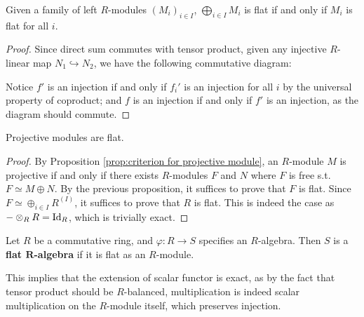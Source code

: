 \begin{proposition}
    Given a family of left $R$-modules $(M_i)_{i \in I}$, $\bigoplus_{i\in I} M_i$ is flat if and only if $M_i$ is flat for all $i$.
\end{proposition}

\begin{proof}
    Since direct sum commutes with tensor product, given any injective $R$-linear map $N_1 \hookrightarrow N_2$, we have the following commutative diagram:
    \begin{figure}[htbp]
        \centering
    \end{figure}
    Notice $f'$ is an injection if and only if $f_i'$ is an injection for all $i$ by the universal property of coproduct; and $f$ is an injection if and only if $f'$ is an injection, as the diagram should commute.
\end{proof}

\begin{corollary}
    Projective modules are flat.
\end{corollary}

\begin{proof}
    By Proposition \ref{prop:criterion for projective module}, an $R$-module $M$ is projective if and only if there exists $R$-modules $F$ and $N$ where $F$ is free s.t. $F \simeq M \oplus N$. By the previous proposition, it suffices to prove that $F$ is flat. Since $F \simeq \oplus_{i \in I} R^{(I)}$, it suffices to prove that $R$ is flat. This is indeed the case as $- \otimes_R R = \mathrm{Id}_R$, which is trivially exact.
\end{proof}

\begin{definition}
    Let $R$ be a commutative ring, and $\varphi: R \to S$ specifies an $R$-algebra. Then $S$ is a \textbf{flat $\mathbf{R}$-algebra} if it is flat as an $R$-module. 
\end{definition}

\begin{remark}
    This implies that the extension of scalar functor is exact, as by the fact that tensor product should be $R$-balanced, multiplication is indeed scalar multiplication on the $R$-module itself, which preserves injection. 
\end{remark}


